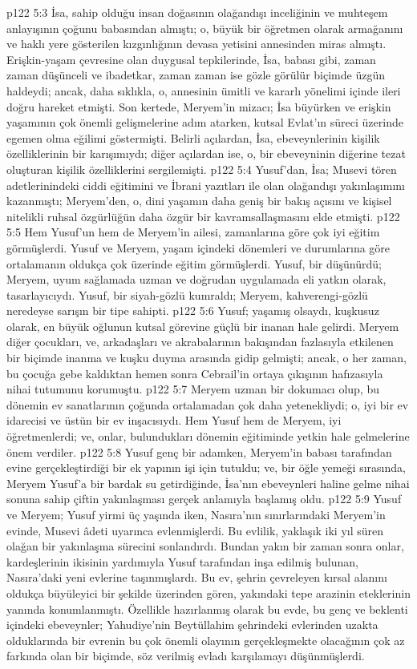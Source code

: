 \vs p122 5:3 İsa, sahip olduğu insan doğasının olağandışı inceliğinin ve muhteşem anlayışının çoğunu babasından almıştı; o, büyük bir öğretmen olarak armağanını ve haklı yere gösterilen kızgınlığının devasa yetisini annesinden miras almıştı. Erişkin\hyp{}yaşam çevresine olan duygusal tepkilerinde, İsa, babası gibi, zaman zaman düşünceli ve ibadetkar, zaman zaman ise gözle görülür biçimde üzgün haldeydi; ancak, daha sıklıkla, o, annesinin ümitli ve kararlı yönelimi içinde ileri doğru hareket etmişti. Son kertede, Meryem’in mizacı; İsa büyürken ve erişkin yaşamının çok önemli gelişmelerine adım atarken, kutsal Evlat’ın süreci üzerinde egemen olma eğilimi göstermişti. Belirli açılardan, İsa, ebeveynlerinin kişilik özelliklerinin bir karışımıydı; diğer açılardan ise, o, bir ebeveyninin diğerine tezat oluşturan kişilik özelliklerini sergilemişti.
\vs p122 5:4 Yusuf’dan, İsa; Musevi tören adetlerinindeki ciddi eğitimini ve İbrani yazıtları ile olan olağandışı yakınlaşımını kazanmıştı; Meryem’den, o, dini yaşamın daha geniş bir bakış açısını ve kişisel nitelikli ruhsal özgürlüğün daha özgür bir kavramsallaşmasını elde etmişti.
\vs p122 5:5 Hem Yusuf’un hem de Meryem’in ailesi, zamanlarına göre çok iyi eğitim görmüşlerdi. Yusuf ve Meryem, yaşam içindeki dönemleri ve durumlarına göre ortalamanın oldukça çok üzerinde eğitim görmüşlerdi. Yusuf, bir düşünürdü; Meryem, uyum sağlamada uzman ve doğrudan uygulamada eli yatkın olarak, tasarlayıcıydı. Yusuf, bir siyah\hyp{}gözlü kumraldı; Meryem, kahverengi\hyp{}gözlü neredeyse sarışın bir tipe sahipti.
\vs p122 5:6 Yusuf; yaşamış olsaydı, kuşkusuz olarak, en büyük oğlunun kutsal görevine güçlü bir inanan hale gelirdi. Meryem diğer çocukları, ve, arkadaşları ve akrabalarının bakışından fazlasıyla etkilenen bir biçimde inanma ve kuşku duyma arasında gidip gelmişti; ancak, o her zaman, bu çocuğa gebe kaldıktan hemen sonra Cebrail’in ortaya çıkışının hafızasıyla nihai tutumunu korumuştu.
\vs p122 5:7 Meryem uzman bir dokumacı olup, bu dönemin ev sanatlarının çoğunda ortalamadan çok daha yetenekliydi; o, iyi bir ev idarecisi ve üstün bir ev inşacısıydı. Hem Yusuf hem de Meryem, iyi öğretmenlerdi; ve, onlar, bulundukları dönemin eğitiminde yetkin hale gelmelerine önem verdiler.
\vs p122 5:8 Yusuf genç bir adamken, Meryem’in babası tarafından evine gerçekleştirdiği bir ek yapının işi için tutuldu; ve, bir öğle yemeği sırasında, Meryem Yusuf’a bir bardak su getirdiğinde, İsa’nın ebeveynleri haline gelme nihai sonuna sahip çiftin yakınlaşması gerçek anlamıyla başlamış oldu.
\vs p122 5:9 Yusuf ve Meryem; Yusuf yirmi üç yaşında iken, Nasıra’nın sınırlarındaki Meryem’in evinde, Musevi âdeti uyarınca evlenmişlerdi. Bu evlilik, yaklaşık iki yıl süren olağan bir yakınlaşma sürecini sonlandırdı. Bundan yakın bir zaman sonra onlar, kardeşlerinin ikisinin yardımıyla Yusuf tarafından inşa edilmiş bulunan, Nasıra’daki yeni evlerine taşınmışlardı. Bu ev, şehrin çevreleyen kırsal alanını oldukça büyüleyici bir şekilde üzerinden gören, yakındaki tepe arazinin eteklerinin yanında konumlanmıştı. Özellikle hazırlanmış olarak bu evde, bu genç ve beklenti içindeki ebeveynler; Yahudiye’nin Beytüllahim şehrindeki evlerinden uzakta olduklarında bir evrenin bu çok önemli olayının gerçekleşmekte olacağının çok az farkında olan bir biçimde, söz verilmiş evladı karşılamayı düşünmüşlerdi.
